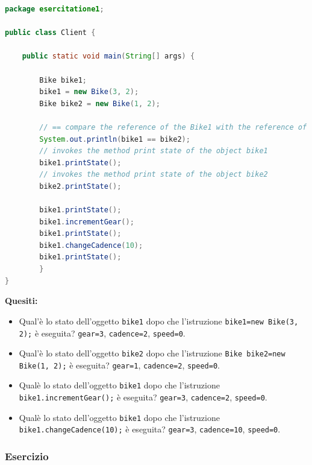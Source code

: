 \documentclass{article}
\theoremstyle{definition}
\begin{document}
\begin{lstlisting}[language=Java,escapechar=|]
package esercitatione1;

public class Client {

	public static void main(String[] args) {

		Bike bike1;
		bike1 = new Bike(3, 2);
		Bike bike2 = new Bike(1, 2);

		// == compare the reference of the Bike1 with the reference of the Bike2
		System.out.println(bike1 == bike2);
		// invokes the method print state of the object bike1
		bike1.printState();
		// invokes the method print state of the object bike2
		bike2.printState();

		bike1.printState();
		bike1.incrementGear();
		bike1.printState();
		bike1.changeCadence(10);
		bike1.printState();
	    }
}
\end{lstlisting}
\textbf{Quesiti:}\\
\begin{itemize}
\item Qual'\`e lo stato dell'oggetto \texttt{bike1} dopo che l'istruzione   \texttt{bike1=new Bike(3, 2);} \`e eseguita? 
\texttt{gear=3}, \texttt{cadence=2}, \texttt{speed=0}.
\item Qual'\`e lo stato dell'oggetto  \texttt{bike2} dopo che l'istruzione  \texttt{Bike bike2=new Bike(1, 2);} \`e eseguita? 
\texttt{gear=1}, \texttt{cadence=2}, \texttt{speed=0}.
\item Qual\`e lo stato dell'oggetto \texttt{bike1} dopo che l'istruzione \texttt{bike1.incrementGear();} \`e eseguita? 
\texttt{gear=3}, \texttt{cadence=2}, \texttt{speed=0}.
\item Qual\`e lo stato dell'oggetto \texttt{bike1} dopo che l'istruzione   \texttt{bike1.changeCadence(10);} \`e eseguita? 
\texttt{gear=3}, \texttt{cadence=10}, \texttt{speed=0}.
\end{itemize}

\subsubsection{Esercizio}
\end{document}
